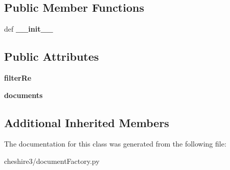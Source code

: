 \subsection*{Public Member Functions}
\begin{DoxyCompactItemize}
\item 
\hypertarget{classcheshire3_1_1document_factory_1_1_multiple_document_stream_abab5b68e51429311c452e647de05604b}{def {\bfseries \-\_\-\-\_\-init\-\_\-\-\_\-}}\label{classcheshire3_1_1document_factory_1_1_multiple_document_stream_abab5b68e51429311c452e647de05604b}

\end{DoxyCompactItemize}
\subsection*{Public Attributes}
\begin{DoxyCompactItemize}
\item 
\hypertarget{classcheshire3_1_1document_factory_1_1_multiple_document_stream_a0593a80b17c56f203f575394a77037a2}{{\bfseries filter\-Re}}\label{classcheshire3_1_1document_factory_1_1_multiple_document_stream_a0593a80b17c56f203f575394a77037a2}

\item 
\hypertarget{classcheshire3_1_1document_factory_1_1_multiple_document_stream_adf37849c0b5778f7728b519e81bd52d4}{{\bfseries documents}}\label{classcheshire3_1_1document_factory_1_1_multiple_document_stream_adf37849c0b5778f7728b519e81bd52d4}

\end{DoxyCompactItemize}
\subsection*{Additional Inherited Members}


The documentation for this class was generated from the following file\-:\begin{DoxyCompactItemize}
\item 
cheshire3/document\-Factory.\-py\end{DoxyCompactItemize}
